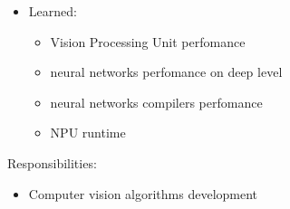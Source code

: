 \documentclass[a4paper,11pt]{memoir}
\newif\ifdetailed
\begin{document}
{\begin{itemize}
\begin{itemize}
		\item creation/development of the framework for pre-silicon validation
		\item ensured all hardware features of NPU are tested on pre-silicon stage
	\end{itemize}
	\item Learned:
	\begin{itemize} 
		\item Vision Processing Unit perfomance
		\item neural networks perfomance on deep level
		\item neural networks compilers perfomance
		\item NPU runtime
	\end{itemize}
\end{itemize}
\fi
}

{
\ifdetailed
Contact info:
\begin{itemize}
	\item Address: Russia, Nizhnii Novgorod, Turgeneva 30
	\item Phone/e-mail: +7 495 641 45 00 / bhr.russia@intel.com
\end{itemize}
\fi
}

{
\ifdetailed
Contact info:
\begin{itemize}
	\item Address: Russia, Krasnodar, Putevaya 11
	\item Phone/e-mail: +7 861 200 95 71 / v.a.feshin@kalashnikovconcern.ru
\end{itemize}
\fi
Responsibilities:
\begin{itemize}
	\item Computer vision algorithms development
\end{itemize}
\ifdetailed
Detailed achievements:
\begin{itemize}
	\item Developed a palms veins pattern matching algorithm for \href{https://en.kalashnikovgroup.ru/media/perspektivnye-razrabotki/kontsern-kalashnikov-predstavil-sobstvennyy-biometricheskiy-skaner}{biometrical \mbox{scanner}}
\end{itemize}
\fi
}

\ifdetailed
\clearpage %
\end{document}
